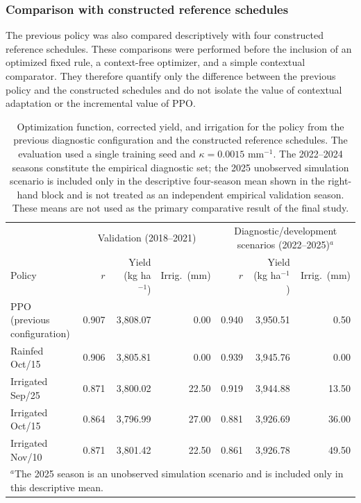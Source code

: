 \documentclass[times,final,authoryear]{elsarticle}
\begin{document}
\subsubsection{Comparison with constructed reference schedules}
\label{subres_diagnostic_schedules}

The previous policy was also compared descriptively with four constructed reference schedules. These comparisons were performed before the inclusion of an optimized fixed rule, a context-free optimizer, and a simple contextual comparator. They therefore quantify only the difference between the previous policy and the constructed schedules and do not isolate the value of contextual adaptation or the incremental value of PPO.

\begin{table}[!h]
\centering
\footnotesize
\caption{Optimization function, corrected yield, and irrigation for the policy from the previous diagnostic configuration and the constructed reference schedules. The evaluation used a single training seed and $\kappa=0.0015$ mm$^{-1}$. The 2022--2024 seasons constitute the empirical diagnostic set; the 2025 unobserved simulation scenario is included only in the descriptive four-season mean shown in the right-hand block and is not treated as an independent empirical validation season. These means are not used as the primary comparative result of the final study.}
\label{tab_comparacao_baselines}
\begin{tabular}{lrrrrrr}
\hline
 & \multicolumn{3}{c}{Validation (2018--2021)} & \multicolumn{3}{c}{Diagnostic/development scenarios (2022--2025)$^{a}$} \\
Policy & $r$ & Yield (kg ha$^{-1}$) & Irrig.\ (mm) & $r$ & Yield (kg ha$^{-1}$) & Irrig.\ (mm) \\
\hline
PPO (previous configuration) & 0.907 & 3,808.07 & 0.00 & 0.940 & 3,950.51 & 0.50 \\
Rainfed Oct/15              & 0.906 & 3,805.81 & 0.00 & 0.939 & 3,945.76 & 0.00 \\
Irrigated Sep/25            & 0.871 & 3,800.02 & 22.50 & 0.919 & 3,944.88 & 13.50 \\
Irrigated Oct/15            & 0.864 & 3,796.99 & 27.00 & 0.881 & 3,926.69 & 36.00 \\
Irrigated Nov/10            & 0.871 & 3,801.42 & 22.50 & 0.861 & 3,926.78 & 49.50 \\
\hline
\multicolumn{7}{l}{\scriptsize $^{a}$The 2025 season is an unobserved simulation scenario and is included only in this descriptive mean.}
\end{tabular}
\end{table}
\end{document}
